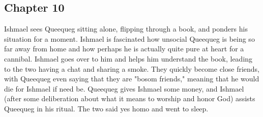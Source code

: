 \subsection{Chapter 10}

Ishmael sees Queequeg sitting alone, flipping through a book, and ponders his
situation for a moment. Ishmael is fascinated how unsocial Queequeg is being
so far away from home and how perhaps he is actually quite pure at heart for a
cannibal. Ishmael goes over to him and helps him understand the book, leading
to the two having a chat and sharing a smoke. They quickly become close
friends, with Queequeg even saying that they are "bosom friends," meaning that
he would die for Ishmael if need be. Queequeg gives Ishmael some money, and
Ishmael (after some deliberation about what it means to worship and honor God)
assists Queequeg in his ritual. The two said yes homo and went to sleep.
